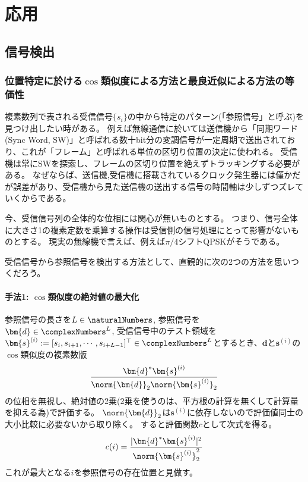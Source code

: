\part{応用}
    \chapter{信号検出}
        \section{位置特定に於ける$\cos$類似度による方法と最良近似による方法の等価性}
            複素数列で表される受信信号$\{s_i\}$の中から特定のパターン(「参照信号」と呼ぶ)を見つけ出したい時がある。
            例えば無線通信に於いては送信機から「同期ワード (Sync Word, SW)」と呼ばれる数十bit分の変調信号が一定周期で送出されており、これが「フレーム」と呼ばれる単位の区切り位置の決定に使われる。
            受信機は常にSWを探索し、フレームの区切り位置を絶えずトラッキングする必要がある。
            なぜならば、送信機,受信機に搭載されているクロック発生器には僅かだが誤差があり、受信機から見た送信機の送出する信号の時間軸は少しずつズレていくからである。
            \par
            今、受信信号列の全体的な位相には関心が無いものとする。
            つまり、信号全体に大きさ1の複素定数を乗算する操作は受信側の信号処理にとって影響がないものとする。
            現実の無線機で言えば、例えば$\pi/4$シフトQPSKがそうである。
            \par
            受信信号から参照信号を検出する方法として、直観的に次の2つの方法を思いつくだろう。
            \subsection{手法1: $\cos$類似度の絶対値の最大化}
                \label{手法1: cos類似度の絶対値の最大化}
                参照信号の長さを$L\in\naturalNumbers$, 参照信号を$\bm{d} \in \complexNumbers^L$, 受信信号中のテスト領域を$\bm{s}^{(i)} := [s_i,s_{i+1},\cdots,s_{i+L-1}]^\top \in \complexNumbers^L$とするとき、$\bm{d}$と$\bm{s}^{(i)}$の$\cos$類似度の複素数版
                \[ \frac{\bm{d}^*\bm{s}^{(i)}}{\norm{\bm{d}}_2\norm{\bm{s}^{(i)}}_2} \]
                の位相を無視し、絶対値の2乗(2乗を使うのは、平方根の計算を無くして計算量を抑える為)で評価する。
                $\norm{\bm{d}}_2$は$\bm{s}^{(i)}$に依存しないので評価値同士の大小比較に必要ないから取り除く。
                すると評価関数$c$として次式を得る。
                \[ c(i) = \frac{|\bm{d}^*\bm{s}^{(i)}|^2}{\norm{\bm{s}^{(i)}}_2^2} \]
                これが最大となる$i$を参照信号の存在位置と見做す。
